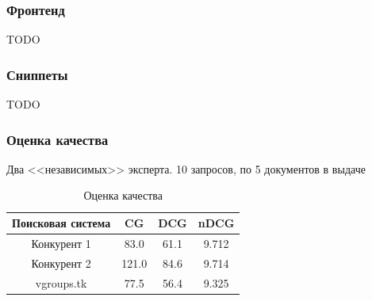 \documentclass{beamer}
\begin{document}
\begin{frame}
  \frametitle{Фронтенд}
    TODO
\end{frame}

\begin{frame}
  \frametitle{Сниппеты}
    TODO
\end{frame}

\begin{frame}
  \frametitle{Оценка качества}
    Два <<независимых>> эксперта. 10 запросов, по 5 документов в выдаче
    \begin{center}
    \begin{table}[!htb]
      \begin{tabu}{|c|c|c|c|}
        \hline
        Поисковая система & CG    & DCG     & nDCG \\ \hline
        Конкурент 1       & 83.0  &  61.1   & 9.712  \\ \hline
        Конкурент 2       & 121.0 &  84.6   & 9.714   \\ \hline
        vgroups.tk        & 77.5  &  56.4   & 9.325   \\ \hline
      \end{tabu}
    \caption{Оценка качества}
    \end{table}
  \end{center}
\end{frame}
\end{document}
